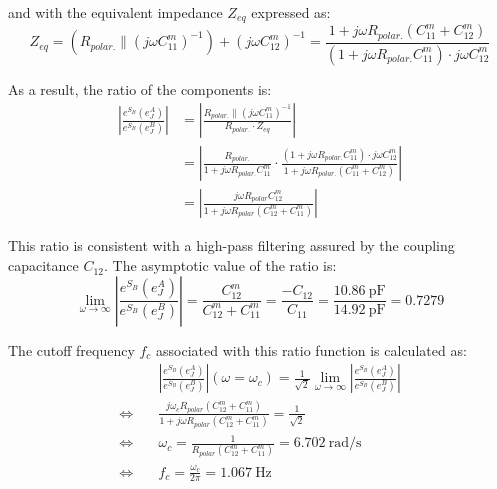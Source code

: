 and with the equivalent impedance $Z_{eq}$ expressed as:
\begin{equation}
Z_{eq}
=
\left( R_{polar.} \parallel (j \omega C_{11}^m)^{-1} \right) + (j \omega  C_{12}^m)^{-1}
=
\frac{1 + j \omega R_{polar.} ( C_{11}^m + C_{12}^m )}{(1 + j\omega R_{polar.} C_{11}^m) \cdot j\omega C_{12}^m}
\end{equation}

As a result, the ratio of the components is:
\begin{equation}
\begin{split}
\left\vert
\frac{
e^{S_B} \left( e_J^A \right)
}{
e^{S_B} \left( e_J^B \right)
}
\right\vert
&=
\left\vert
\frac{R_{polar.} \parallel (j\omega C_{11}^m)^{-1} }{R_{polar.} \cdot Z_{eq}}
\right\vert
\\
&=
\left\vert
\frac{R_{polar.}}{1 + j \omega R_{polar.} C_{11}^m}
\cdot 
\frac{(1 + j\omega R_{polar.} C_{11}^m) \cdot j\omega C_{12}^m}{1 + j \omega R_{polar.} ( C_{11}^m + C_{12}^m )}
\right\vert
\\
&=
\left\vert
\frac{ j \omega R_{polar} C_{12}^m }{ 1 + j \omega R_{polar} \left( C_{12}^m + C_{11}^m \right) }
\right\vert
\end{split}
\end{equation}

This ratio is consistent with a high-pass filtering assured by the coupling capacitance $C_{12}$. The asymptotic value of the ratio is:
\begin{equation}
\label{eq:planar38-analytical}
\lim_{\omega \to \infty}
\left\vert
\frac{
e^{S_B} \left( e_J^A \right)
}{
e^{S_B} \left( e_J^B \right)
}
\right\vert
=
  \frac{ C_{12}^m }{ C_{12}^m + C_{11}^m }
=
  \frac{ -C_{12} }{ C_{11} }
=
  \frac{ \SI{10.86}{\pico\farad} }{ \SI{14.92}{\pico\farad} }
=
  0.7279
\end{equation}

The cutoff frequency $f_c$ associated with this ratio function is calculated as:
\begin{equation}
\label{eq:planar38-cutoff}
\begin{split}
&
\left\vert
\frac{
e^{S_B} \left( e_J^A \right)
}{
e^{S_B} \left( e_J^B \right)
}
\right\vert
(\omega = \omega_c)
=
\frac{1}{\sqrt{2}}
\lim_{\omega \to \infty}
\left\vert
\frac{
e^{S_B} \left( e_J^A \right)
}{
e^{S_B} \left( e_J^B \right)
}
\right\vert
\\
\Leftrightarrow \quad &
\frac{ j \omega_c R_{polar} \left( C_{12}^m + C_{11}^m \right) }{ 1 + j \omega R_{polar} \left( C_{12}^m + C_{11}^m \right) }
=
\frac{1}{\sqrt{2}}
\\
\Leftrightarrow \quad &
\omega_c = \frac{1}{R_{polar} \left( C_{12}^m + C_{11}^m \right)} = \SI{6.702}{\radian\per\s}
\\
\Leftrightarrow \quad &
f_c = \frac{\omega_c}{2\pi} = \SI{1.067}{\Hz}
\end{split}
\end{equation}

